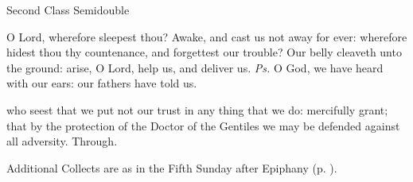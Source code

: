 \begin{inhead}
{Second Class Semidouble}
\end{inhead}
\par\noindent
{}




\properantiphonfix

\introit
{} O Lord, wherefore sleepest thou? Awake, and cast us not away for ever: wherefore hidest thou thy countenance, and forgettest our trouble? Our belly cleaveth unto the ground: arise, O Lord, help us, and deliver us. \textit{Ps.} O God, we have heard with our ears: our fathers have told us.

\collect
{} who seest that we put not our trust in any thing that we do: mercifully grant; that by the protection of the Doctor of the Gentiles we may be defended against all adversity. Through.
\begin{rubric}
    Additional Collects are as in the Fifth Sunday after Epiphany (p. \pageref{EpiphanyVCollect}).
\end{rubric}

